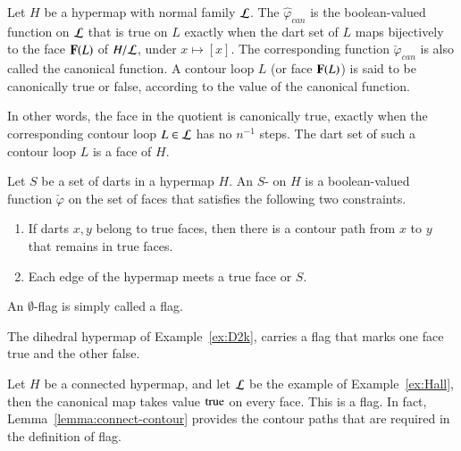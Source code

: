 \begin{definition}
 Let $H$ be a hypermap with
  normal family $\cal L$.  The 
  $\hat\varphi_{can}$ is the boolean-valued function on ${\cal L}$
  that is true on $L$ exactly when the dart set of $L$ maps
  bijectively to the face ${\mathbf F}(L)$ of $H/{\cal L}$, under $x\mapsto [x]$.  The
  corresponding function $\check\varphi_{can}$ is also called the
  canonical function.  A contour loop $L$ (or face ${\mathbf F}(L)$)
  is said to be canonically true or false, according to the value of the canonical
  function.  
%
\end{definition}

In other words, the face in the quotient is canonically true, exactly
when the corresponding contour loop $L\in {\cal L}$ has no $n^{-1}$
steps.  The dart set of such a contour loop $L$ is a face of $H$.  


\begin{definition}[flag]\label{def:flag} 
  Let $S$ be a set of darts in a hypermap $H$.  An $S$-
  on $H$ is a boolean-valued function $\check\varphi$ on the set of faces that
  satisfies the following two constraints.
\begin{enumerate}
\item If darts $x,y$ belong to true faces,
then there is a contour path from $x$ to $y$ that remains
in true faces.
\item Each edge of the hypermap meets a true face or $S$.
\end{enumerate}
An $\emptyset$-flag is simply called a flag.
%
%
\end{definition}



\begin{example} 
The dihedral hypermap of Example~\ref{ex:D2k}, carries a
flag that marks one face true and the other false.
\end{example}

\begin{example}\label{ex:Hall-flag} 
Let $H$ be a connected hypermap, and let $\cal L$ be the example of
Example~\ref{ex:Hall}, then the canonical map takes value
${\operatorname{true}}$ on every face.  This is a flag. In fact,
Lemma~\ref{lemma:connect-contour} provides the contour paths that
are required in the definition of flag.
\end{example}


